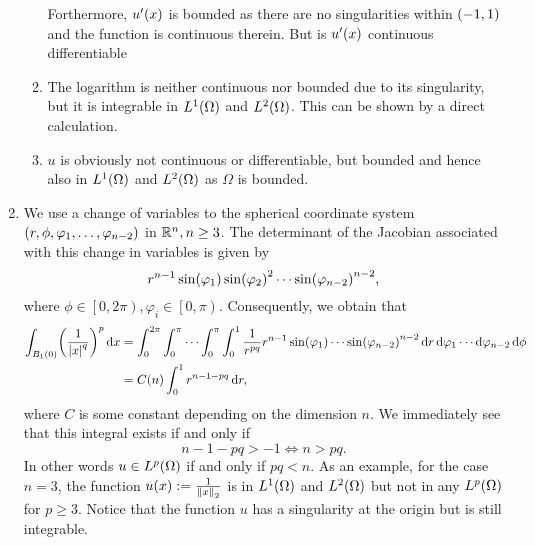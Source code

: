 \documentclass[english]{exercise}
\begin{document}
\begin{enumerate}
\begin{enumerate}
			Forthermore, \(u'\parentheses*{x}\) is bounded as there are no singularities within \(\parentheses*{-1, 1}\) and the function is continuous therein.
			But is \(u'\parentheses*{x}\) continuous differentiable 
			\item The logarithm is neither continuous nor bounded due to its singularity, but it is integrable in \(L^1\parentheses*{\Omega}\) and \(L^2\parentheses*{\Omega}\).
			This can be shown by a direct calculation.
			\item \(u\) is obviously not continuous or differentiable, but bounded and hence also in \(L^1\parentheses*{\Omega}\) and \(L^2\parentheses*{\Omega}\) as \(\Omega\) is bounded.
		\end{enumerate}
		\item We use a change of variables to the spherical coordinate system \(\parentheses*{r, \phi, \varphi_1, \ldots, \varphi_{n - 2}}\) in \(\R^n, n \ge 3\).
		The determinant of the Jacobian associated with this change in variables is given by
		\[
			r^{n - 1}\sin\parentheses*{\varphi_1}\sin\parentheses*{\varphi_2}^2 \cdots \sin\parentheses*{\varphi_{n - 2}}^{n - 2},
		\]
		where \(\phi \in \left[0, 2\pi\right), \varphi_i \in \left[0, \pi\right)\).
		Consequently, we obtain that
		\begin{align*}
			\int_{B_1\parentheses*{0}}\parentheses*{\frac{1}{\absolute*{x}^q}}^p \d x &= \int_0^{2\pi}\int_0^\pi \cdots \int_0^\pi \int_0^1 \frac{1}{r^{pq}}r^{n - 1}\sin\parentheses*{\varphi_1} \cdots \sin\parentheses*{\varphi_{n - 2}}^{n - 2}\d r\d\varphi_1 \cdots \d\varphi_{n - 2}\d\phi\\
			&= C\parentheses*{n}\int_0^1 r^{n - 1 - pq}\d r,
		\end{align*}
		where \(C\) is some constant depending on the dimension \(n\).
		We immediately see that this integral exists if and only if
		\[
			n - 1 - pq > -1 \iff n > pq.
		\]
		In other words \(u \in L^p\parentheses*{\Omega}\) if and only if \(pq < n\).
		As an example, for the case \(n = 3\), the function \(u\parentheses*{x} := \frac{1}{\norm*{x}_2}\) is in \(L^1\parentheses*{\Omega}\) and \(L^2\parentheses*{\Omega}\) but not in any \(L^p\parentheses*{\Omega}\) for \(p \ge 3\).
		Notice that the function \(u\) has a singularity at the origin but is still integrable.
	\end{enumerate}


	\section{}
\end{document}
